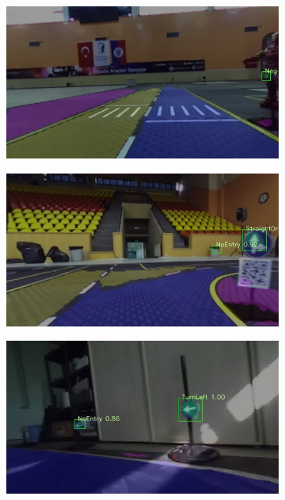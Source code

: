 \begin{figure}[h]
  \centering
  \begin{subfigure}[b]{0.45\linewidth}
    \includegraphics[width=\linewidth]{figures/experiments/real/fn-pedestrian.jpg}
  \end{subfigure}
  \begin{subfigure}[b]{0.45\linewidth}
    \includegraphics[width=\linewidth]{figures/experiments/real/fp-noentry1.jpg}
  \end{subfigure}
  \begin{subfigure}[b]{0.45\linewidth}
    \includegraphics[width=\linewidth]{figures/experiments/real/fp-noentry2.jpg}

\end{subfigure}
\end{figure}
